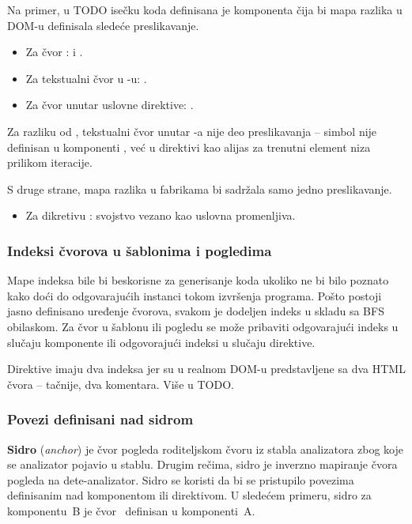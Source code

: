 Na primer, u TODO isečku koda definisana je komponenta čija bi mapa razlika u DOM-u definisala sledeće preslikavanje.

\begin{itemize}
  \item Za čvor :  i .
  \item Za tekstualni čvor u -u: .
  \item Za čvor  unutar uslovne direktive: .
\end{itemize}

Za razliku od , tekstualni čvor  unutar -a nije deo preslikavanja -- simbol  nije definisan u komponenti , već u direktivi  kao alijas za trenutni element niza  prilikom iteracije.

S druge strane, mapa razlika u fabrikama bi sadržala samo jedno preslikavanje.

\begin{itemize}
  \item Za dikretivu : svojstvo  vezano kao uslovna promenljiva.
\end{itemize}

\subsubsection{Indeksi čvorova u šablonima i pogledima}\label{sec:getIndexesFor}\label{sec:getSingleIndexFor}

Mape indeksa bile bi beskorisne za generisanje koda ukoliko ne bi bilo poznato kako doći do odgovarajućih instanci tokom izvršenja programa.
Pošto postoji jasno definisano uređenje čvorova, svakom je dodeljen indeks u skladu sa BFS obilaskom.
Za čvor u šablonu ili pogledu se može pribaviti odgovarajući indeks u slučaju komponente ili odgovorajući indeksi u slučaju direktive.

Direktive imaju dva indeksa jer su u realnom DOM-u predstavljene sa dva HTML čvora -- tačnije, dva komentara.
Više u TODO.

\subsubsection{Povezi definisani nad sidrom}\label{sec:getSelfBindings}

\textbf{Sidro} (\textsl{anchor}) je čvor pogleda roditeljskom čvoru iz stabla analizatora zbog koje se analizator pojavio u stablu.
Drugim rečima, sidro je inverzno mapiranje čvora pogleda na dete-analizator.
Sidro se koristi da bi se pristupilo povezima definisanim nad komponentom ili direktivom.
U sledećem primeru, sidro za komponentu~\code B je čvor~ definisan u komponenti~\code A.

